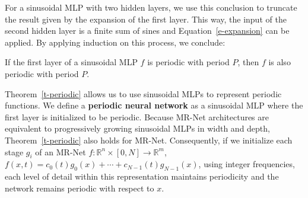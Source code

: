 For a sinusoidal MLP with two hidden layers, we use this conclusion to truncate the result given by the expansion of the first layer. This way, the input of the second hidden layer is a finite sum of sines and Equation~\ref{e-expansion} can be applied. By applying induction on this process, we conclude:

\begin{theorem}
\label{t-periodic}
    If the first layer of a sinusoidal MLP $f$ is periodic with period $P$, then $f$ is also periodic with period $P$.
\end{theorem}

Theorem~\ref{t-periodic} allows us to use sinusoidal MLPs to represent periodic functions. We define a \textbf{periodic neural network} as a sinusoidal MLP where the first layer is initialized to be periodic. Because MR-Net architectures are equivalent to progressively growing sinusoidal MLPs in width and depth, Theorem~\ref{t-periodic} also holds for MR-Net. Consequently, if we initialize each stage \( g_i \) of an MR-Net \( f: \mathbb{R}^n \times [0, N] \to \mathbb{R}^m \), \( f(x, t) = c_0(t) g_0(x) + \cdots + c_{N-1}(t) g_{N-1}(x) \), using integer frequencies, each level of detail within this representation maintains periodicity and the network remains periodic with respect to \( x \).




